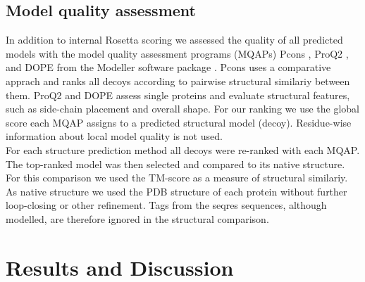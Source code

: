 \documentclass{bioinfo}
\begin{document}
\begin{methods}
\subsection{Model quality assessment}
In addition to internal Rosetta scoring we assessed the quality of all predicted models with the model quality assessment programs (MQAPs) Pcons \cite[]{lundstrom_pcons:_2001}, ProQ2 \cite[]{ray_improved_2012}, and DOPE from the Modeller software package \cite[]{eswar_comparative_2006}. Pcons uses a comparative apprach and ranks all decoys according to pairwise structural similariy between them. ProQ2 and DOPE assess single proteins and evaluate structural features, such as side-chain placement and overall shape. For our ranking we use the global score each MQAP assigns to a predicted structural model (decoy). Residue-wise information about local model quality is not used. \\\indent
For each structure prediction method all decoys were re-ranked with each MQAP. The top-ranked model was then selected and compared to its native structure. For this comparison we used the TM-score \cite[]{zhang_scoring_2004} as a measure of structural similariy. As native structure we used the PDB structure of each protein without further loop-closing or other refinement. Tags from the seqres sequences, although modelled, are therefore ignored in the structural comparison.




\end{methods}

\section{Results and Discussion}
\end{document}
